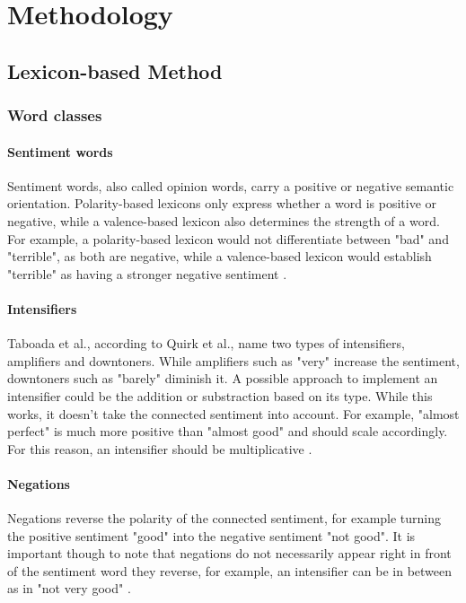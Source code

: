 \chapter{Methodology}
\label{cha:Chapter4_Methodology}

\section{Lexicon-based Method}

\subsection{Word classes}

\subsubsection{Sentiment words}
Sentiment words, also called opinion words, carry a positive or negative semantic orientation. Polarity-based lexicons only express whether a word is positive or negative, while a valence-based lexicon also determines the strength of a word. For example, a polarity-based lexicon would not differentiate between "bad" and "terrible", as both are negative, while a valence-based lexicon would establish "terrible" as having a stronger negative sentiment \cite{DBLP:conf/icwsm/HuttoG14}.

\subsubsection{Intensifiers}

Taboada et al., according to Quirk et al., name two types of intensifiers, amplifiers and downtoners. While amplifiers such as "very" increase the  sentiment, downtoners such as "barely" diminish it. A possible approach to implement an intensifier could be the addition or substraction based on its type. While this works, it doesn't take the connected sentiment into account. For example, "almost perfect" is much more positive than "almost good" and should scale accordingly. For this reason, an intensifier should be multiplicative \cite{10.1162/COLI_a_00049}.

\subsubsection{Negations}
Negations reverse the polarity of the connected sentiment, for example turning the positive sentiment "good" into the negative sentiment "not good". It is important though to note that negations do not necessarily appear right in front of the sentiment word they reverse, for example, an intensifier can be in between as in "not very good" \cite{10.1162/COLI_a_00049}.

